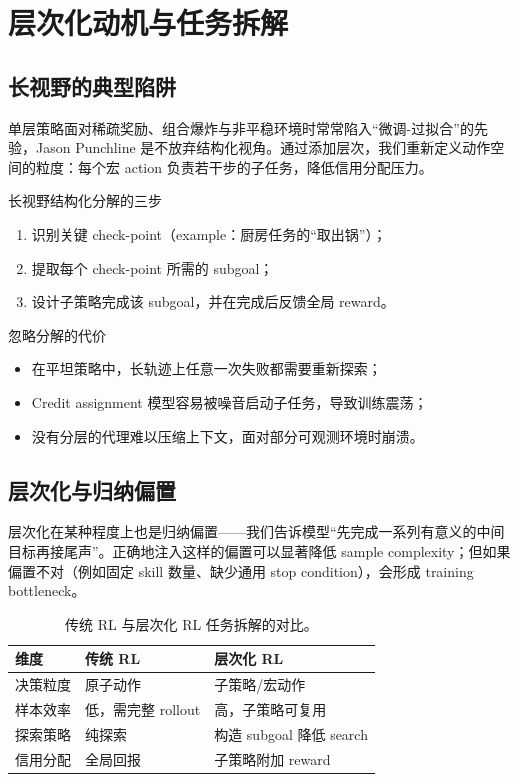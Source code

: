 \section{层次化动机与任务拆解}

\subsection{长视野的典型陷阱}

单层策略面对稀疏奖励、组合爆炸与非平稳环境时常常陷入“微调-过拟合”的先验，Jason Punchline 是不放弃结构化视角。通过添加层次，我们重新定义动作空间的粒度：每个宏 action 负责若干步的子任务，降低信用分配压力。

\begin{knowledgebox}{长视野结构化分解的三步}
\begin{enumerate}
    \item 识别关键 check-point（example：厨房任务的“取出锅”）；
    \item 提取每个 check-point 所需的 subgoal；
    \item 设计子策略完成该 subgoal，并在完成后反馈全局 reward。
\end{enumerate}
\end{knowledgebox}

\begin{warningbox}{忽略分解的代价}
\begin{itemize}
    \item 在平坦策略中，长轨迹上任意一次失败都需要重新探索；
    \item Credit assignment 模型容易被噪音启动子任务，导致训练震荡；
    \item 没有分层的代理难以压缩上下文，面对部分可观测环境时崩溃。
\end{itemize}
\end{warningbox}

\subsection{层次化与归纳偏置}

层次化在某种程度上也是归纳偏置——我们告诉模型“先完成一系列有意义的中间目标再接尾声”。正确地注入这样的偏置可以显著降低 sample complexity；但如果偏置不对（例如固定 skill 数量、缺少通用 stop condition），会形成 training bottleneck。

\begin{table}[H]
\centering
\begin{tabular}{p{4cm}p{5cm}p{3cm}}
\toprule
维度 & 传统 RL & 层次化 RL \\
\midrule
决策粒度 & 原子动作 & 子策略/宏动作 \\
样本效率 & 低，需完整 rollout & 高，子策略可复用 \\
探索策略 & 纯探索 & 构造 subgoal 降低 search \\
信用分配 & 全局回报 & 子策略附加 reward \\
\bottomrule
\end{tabular}
\caption{传统 RL 与层次化 RL 任务拆解的对比。}
\end{table}

